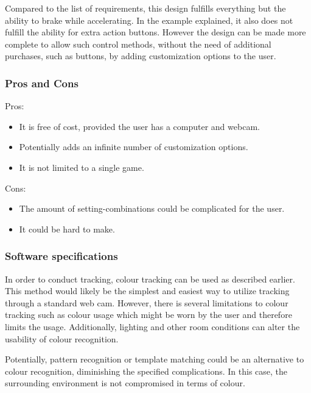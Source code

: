 Compared to the list of requirements, this design fulfills everything but the ability to brake while accelerating. In the example explained, it also does not fulfill the ability for extra action buttons. However the design can be made more complete to allow such control methods, without the need of additional purchases, such as buttons, by adding customization options to the user.


\pagebreak[2]
\subsubsection*{Pros and Cons}
Pros:
\begin{itemize}
\item It is free of cost, provided the user has a computer and webcam.
\item Potentially adds an infinite number of customization options.
\item It is not limited to a single game.
	\end{itemize}
Cons:
\begin{itemize}
\item The amount of setting-combinations could be complicated for the user.
\item It could be hard to make.
\end{itemize}

\subsubsection*{Software specifications}
In order to conduct tracking, colour tracking can be used as described earlier. This method would likely be the simplest and easiest way to utilize tracking through a standard web cam. However, there is several limitations to colour tracking such as colour usage which might be worn by the user and therefore limits the usage. Additionally, lighting and other room conditions can alter the usability of colour recognition.

Potentially, pattern recognition or template matching could be an alternative to colour recognition, diminishing the specified complications. In this case, the surrounding environment is not compromised in terms of colour.

\pagebreak[2]